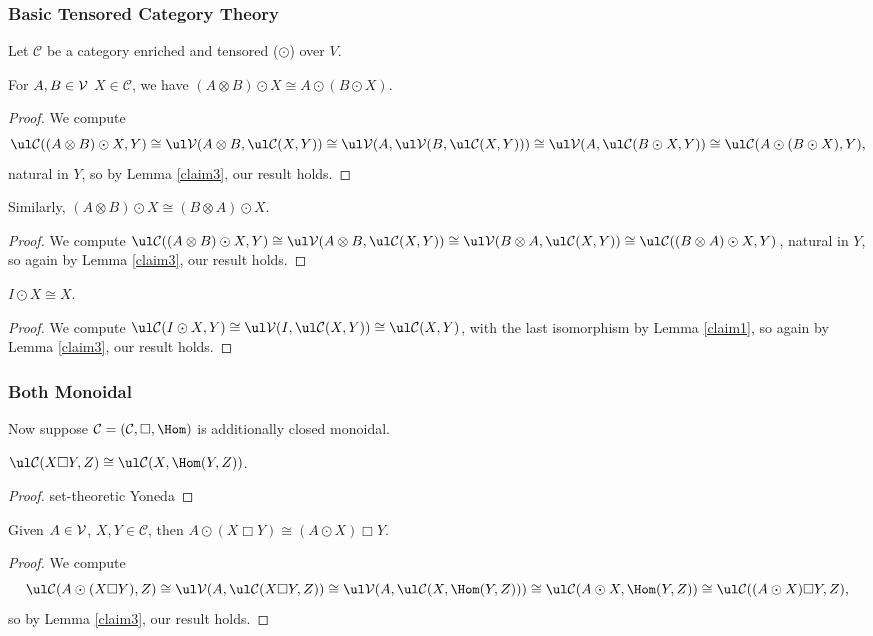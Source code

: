 \documentclass{report}
\renewcommand{\C}{\text{$\mathcal{C}$}}
\begin{document}
\begin{appendices}
\subsubsection{Basic Tensored Category Theory}
Let $\C$ be a category enriched and tensored ($\odot$) over $V$.

\begin{lemma}\label{claim4}
  For $A,B\in \text{$\mathcal{V}$}$ $X\in \C$, we have $(A\otimes B)\odot X \cong A\odot (B\odot X)$.
\end{lemma}
\begin{proof}
  We compute
\[\ul\C((A\otimes B)\odot X, Y) \cong \ul\V(A\otimes B, \ul\C(X,Y)) \cong \ul\V(A,\ul\V(B,\ul\C(X,Y))) \cong \ul\V(A,\ul\C(B\odot X,Y))\cong \ul\C(A\odot(B\odot X), Y),\]
natural in $Y$, so by Lemma \ref{claim3}, our result holds. 
\end{proof}

\begin{lemma}\label{claim5}
  Similarly, $(A\otimes B)\odot X \cong (B\otimes A)\odot X$.
\end{lemma}
\begin{proof}
  We compute $\ul\C((A\otimes B)\odot X, Y) \cong \ul\V(A\otimes B, \ul\C(X,Y)) \cong \ul\V(B\otimes A,\ul\C(X,Y))\cong \ul\C((B\otimes A)\odot X, Y)$, natural in $Y$, so again by Lemma \ref{claim3}, our result holds. 
\end{proof}

\begin{lemma}\label{claim6}
  $I\odot X \cong X$.
\end{lemma}
\begin{proof}
  We compute $\ul\C(I\odot X, Y)\cong \ul\V(I,\ul\C(X,Y)) \cong \ul\C(X,Y)$, with the last isomorphism by Lemma \ref{claim1}, so again by Lemma \ref{claim3}, our result holds.
\end{proof}

\subsubsection{Both Monoidal}
Now suppose $\C = (\C,\Box, \Hom)$ is additionally closed monoidal.

\begin{lemma}
  \label{claim6b}
  $\ul\C(X\Box Y,Z)\cong \ul\C(X,\Hom(Y,Z))$.
\end{lemma}
\begin{proof}
  set-theoretic Yoneda 
\end{proof}

\begin{lemma}
  \label{claim7}
  Given $A\in\text{$\mathcal{V}$}$, $X,Y\in\C$, then $A\odot(X\Box Y)\cong (A\odot X)\Box Y$.
\end{lemma}
\begin{proof}
  We compute
\[\ul\C(A\odot(X\Box Y), Z) \cong \ul\V(A,\ul\C(X\Box Y, Z))\cong\ul\V(A,\ul\C(X,\Hom(Y,Z)))\cong \ul\C(A\odot X, \Hom(Y,Z))\cong \ul\C((A\odot X)\Box Y, Z),\]
so by Lemma \ref{claim3}, our result holds. 
\end{proof}


\end{appendices}
\end{document}
